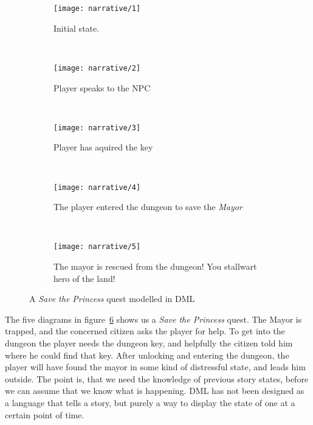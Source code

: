 \begin{figure}[p]
	\centering
	\begin{subfigure}[b]{0.4\textwidth}
		\texttt{[image: narrative/1]}
		\caption{Initial state.}\label{fig:narrative:1}
	\end{subfigure}
		~
	\begin{subfigure}[b]{0.4\textwidth}
		\texttt{[image: narrative/2]}
		\caption{Player speaks to the NPC}\label{fig:narrative:2}
	\end{subfigure}
		~
	\begin{subfigure}[b]{0.4\textwidth}
		\texttt{[image: narrative/3]}
		\caption{Player has aquired the key}\label{fig:narrative:3}
	\end{subfigure}
		~
	\begin{subfigure}[b]{0.4\textwidth}
		\texttt{[image: narrative/4]}
		\caption{The player entered the dungeon to save the \textit{Mayor}}\label{fig:narrative:4}
	\end{subfigure}
	~
	\begin{subfigure}[b]{0.4\textwidth}
		\texttt{[image: narrative/5]}
		\caption{The mayor is rescued from the dungeon! You stallwart hero of the land!}\label{fig:narrative:5}
	\end{subfigure}
	\caption{A \textit{Save the Princess} quest modelled in DML}\label{fig:narrative}
\end{figure}

The five diagrams in figure~\ref{fig:narrative} shows us a \textit{Save the Princess} quest. The Mayor is trapped, and the concerned citizen asks the player for help. To get into the dungeon the player needs the dungeon key, and helpfully the citizen told him where he could find that key. After unlocking and entering the dungeon, the player will have found the mayor in some kind of distressful state, and leads him outside.
The point is, that we need the knowledge of previous story states, before we can assume that we know what is happening. 
DML has not been designed as a language that tells a story, but purely a way to display the state of one at a certain point of time.


